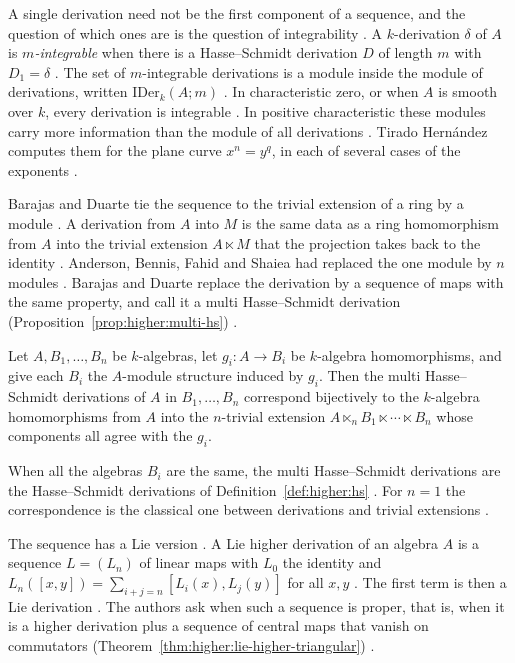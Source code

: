 A single derivation need not be the first component of a sequence, and the
question of which ones are is the question of integrability
\cite[p.~1]{Tirado2021}. A $k$-derivation $\delta$ of $A$ is
\emph{$m$-integrable} when there is a Hasse--Schmidt derivation $D$ of length
$m$ with $D_{1}=\delta$ \cite[p.~1]{Tirado2021}. The set of $m$-integrable
derivations is a module inside the module of derivations, written
$\mathrm{IDer}_{k}(A;m)$ \cite[p.~1]{Tirado2021}. In characteristic zero, or
when $A$ is smooth over $k$, every derivation is integrable
\cite[p.~1]{Tirado2021}. In positive characteristic these modules carry more
information than the module of all derivations \cite[p.~1]{Tirado2021}. Tirado
Hern\'andez computes them for the plane curve $x^{n}=y^{q}$, in each of
several cases of the exponents \cite[Proposition~2.1, p.~4]{Tirado2021}.

Barajas and Duarte tie the sequence to the trivial extension of a ring by a
module \cite[p.~2]{BarajasDuarte2026}. A derivation from $A$ into $M$ is the
same data as a ring homomorphism from $A$ into the trivial extension $A\ltimes
M$ that the projection takes back to the identity
\cite[p.~2]{BarajasDuarte2026}. Anderson, Bennis, Fahid and Shaiea had
replaced the one module by $n$ modules \cite[p.~2]{BarajasDuarte2026}. Barajas
and Duarte replace the derivation by a sequence of maps with the same
property, and call it a multi Hasse--Schmidt derivation
(Proposition~\ref{prop:higher:multi-hs}) \cite[Definition~3.1,
p.~6]{BarajasDuarte2026}.

\begin{proposition}\label{prop:higher:multi-hs}
Let $A,B_{1},\dots,B_{n}$ be $k$-algebras, let $g_{i}\colon A\to B_{i}$ be $k$-algebra
homomorphisms, and give each $B_{i}$ the $A$-module structure induced by $g_{i}$.
Then the multi Hasse--Schmidt derivations of $A$ in $B_{1},\dots,B_{n}$ correspond
bijectively to the $k$-algebra homomorphisms from $A$ into the $n$-trivial
extension $A\ltimes_{n}B_{1}\ltimes\cdots\ltimes B_{n}$ whose components all agree
with the $g_{i}$.
\end{proposition}

When all the algebras $B_{i}$ are the same, the multi Hasse--Schmidt
derivations are the Hasse--Schmidt derivations of
Definition~\ref{def:higher:hs} \cite[p.~2]{BarajasDuarte2026}. For $n=1$ the
correspondence is the classical one between derivations and trivial extensions
\cite[p.~2]{BarajasDuarte2026}.

The sequence has a Lie version \cite[p.~1]{AshrafAnsari2021}. A Lie higher
derivation of an algebra $A$ is a sequence $L=(L_{n})$ of linear maps with
$L_{0}$ the identity and $L_{n}([x,y])=\sum_{i+j=n}[L_{i}(x),L_{j}(y)]$ for
all $x,y$ \cite[p.~1]{AshrafAnsari2021}. The first term is then a Lie
derivation \cite[p.~1]{AshrafAnsari2021}. The authors ask when such a sequence
is proper, that is, when it is a higher derivation plus a sequence of central
maps that vanish on commutators
(Theorem~\ref{thm:higher:lie-higher-triangular})
\cite[p.~1]{AshrafAnsari2021}.

